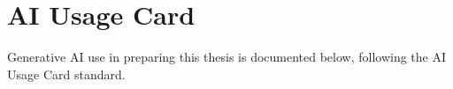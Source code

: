 \section{AI Usage Card}
\label{app:ai-usage}

Generative AI use in preparing this thesis is documented below, following the AI Usage Card standard.

\begingroup
\vspace{8pt}
\enlargethispage{5\baselineskip}
\let\footnotesize\scriptsize
\renewcommand{\arraystretch}{0.72}
\makeAIUsageCard
\endgroup
